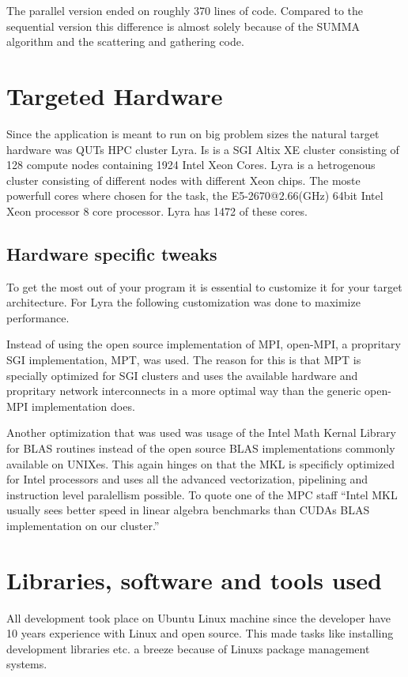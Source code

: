 \documentclass{article}
\begin{document}
The parallel version ended on roughly 370 lines of code. Compared to the sequential version this difference
is almost solely because of the SUMMA algorithm and the scattering and gathering code.

\section{Targeted Hardware}
Since the application is meant to run on big problem sizes the natural target hardware was QUTs
HPC cluster Lyra. Is is a SGI Altix XE cluster consisting of 128 compute nodes containing 1924 Intel Xeon Cores. Lyra is a
hetrogenous cluster consisting of different nodes with different Xeon chips.
The moste powerfull cores where chosen for the task, the E5-2670@2.66(GHz) 64bit Intel Xeon processor 8 core processor.
Lyra has 1472 of these cores.
\subsection{Hardware specific tweaks}
To get the most out of your program it is essential to customize it for your target architecture.
For Lyra the following customization was done to maximize performance.

Instead of using the open source implementation of MPI, open-MPI, a propritary SGI
implementation, MPT, was used. The reason for this is that MPT is specially optimized
for SGI clusters and uses the available hardware and propritary network interconnects
in a more optimal way than the generic open-MPI implementation does.

Another optimization that was used was usage of the Intel Math Kernal Library\cite{mkl} for
BLAS\cite{blas} routines instead of the open source BLAS implementations commonly available
on UNIXes. This again hinges on that the MKL is specificly optimized for Intel processors
and uses all the advanced vectorization, pipelining and instruction level paralellism
possible. To quote one of the MPC staff ``Intel MKL usually sees better speed in linear
algebra benchmarks than CUDAs BLAS implementation on our cluster.''


\section{Libraries, software and tools used}
All development took place on Ubuntu Linux machine since the developer
have 10 years experience with Linux and open source. This made tasks like
installing development libraries etc. a breeze because of Linuxs package
management systems.
\end{document}
